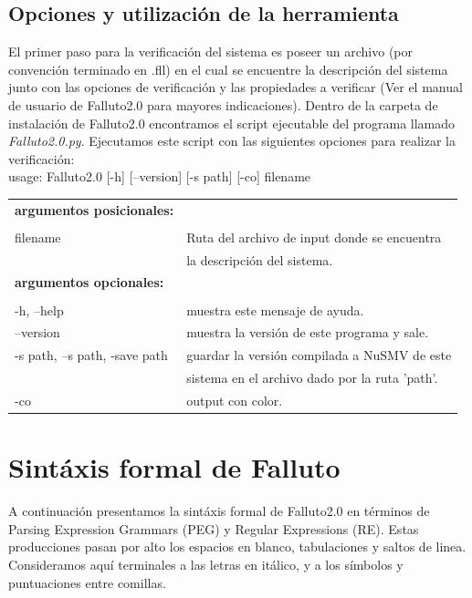 \documentclass[titlepage, 12pt]{book}
\begin{document}
\section{Opciones y utilizaci\'on de la herramienta}
El primer paso para la verificaci\'on del sistema es poseer un archivo (por convenci\'on terminado en .fll) en el cual se encuentre la descripci\'on del sistema junto con las opciones de verificaci\'on y las propiedades a verificar (Ver el manual de usuario de Falluto2.0 para mayores indicaciones). Dentro de la carpeta de instalaci\'on de Falluto2.0 encontramos el script ejecutable del programa llamado \textit{Falluto2.0.py}. Ejecutamos este script con las siguientes opciones para realizar la verificaci\'on:\\


\noindent usage: Falluto2.0 [-h] [--version] [-s path] [-co] filename\\


\begin{tabular}{ll}
\textbf{argumentos posicionales:}\\\\
filename & Ruta del archivo de input donde se encuentra \\
         & la descripci\'on del sistema.\\
\textbf{argumentos opcionales:} & \\\\
-h, --help          & muestra este mensaje de ayuda.\\
--version           & muestra la versi\'on de este programa y sale.\\
-s path, --s path, -save path & guardar la versi\'on compilada a NuSMV de este \\
                              & sistema en el archivo dado por la ruta 'path'.\\
-co 		        & output con color.\\
\end{tabular}





\chapter{Sint\'axis formal de Falluto}
\label{sintaxisFormal}

A continuaci\'on presentamos la sint\'axis formal de Falluto2.0 en t\'erminos de Parsing Expression Grammars (PEG) y Regular Expressions (RE). Estas producciones pasan por alto los espacios en blanco, tabulaciones y saltos de linea. Consideramos aqu\'i terminales a las letras en it\'alico, y a los s\'imbolos y puntuaciones entre comillas.
\end{document}
